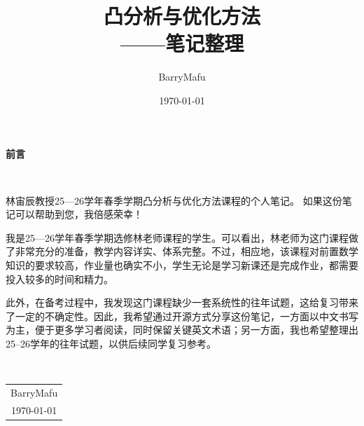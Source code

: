 \documentclass[12pt, a4paper, oneside]{ctexbook}
\title{{\Huge{\textbf{凸分析与优化方法}}}\\——笔记整理}
\author{BarryMafu}
\date{\today}
\begin{document}
\maketitle

\setcounter{page}{1}

\begin{center}
    \Huge\textbf{前言}
\end{center}~\

林宙辰教授25—26学年春季学期凸分析与优化方法课程的个人笔记。 如果这份笔记可以帮助到您，我倍感荣幸！

我是25—26学年春季学期选修林老师课程的学生。可以看出，林老师为这门课程做了非常充分的准备，教学内容详实、体系完整。不过，相应地，该课程对前置数学知识的要求较高，作业量也确实不小，学生无论是学习新课还是完成作业，都需要投入较多的时间和精力。

此外，在备考过程中，我发现这门课程缺少一套系统性的往年试题，这给复习带来了一定的不确定性。因此，我希望通过开源方式分享这份笔记，一方面以中文书写为主，便于更多学习者阅读，同时保留关键英文术语；另一方面，我也希望整理出25–26学年的往年试题，以供后续同学复习参考。


~\\
\begin{flushright}
    \begin{tabular}{c}
        BarryMafu\\
        \today
    \end{tabular}
\end{flushright}

\newpage
{}
\setcounter{page}{1}
\tableofcontents
\newpage
\setcounter{page}{1}

\appendix


\end{document}
